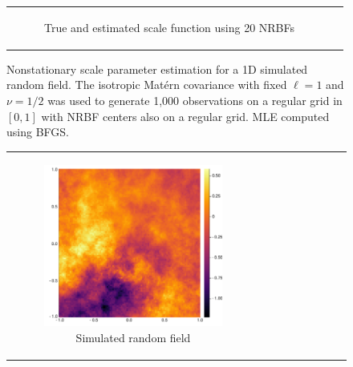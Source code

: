 \documentclass{article}
\numberwithin{equation}{section}
\begin{document}
\begin{figure}[t!]
\begin{tabular}{cc}
\begin{subfigure}[t]{0.3\textwidth}
      \caption{True and estimated scale function using 20 NRBFs}
    \end{subfigure}
  \end{tabular}
  \caption{Nonstationary scale parameter estimation for a 1D simulated random field. The isotropic Mat\'ern covariance with fixed $\ell=1$ and $\nu=1/2$ was used to generate 1,000 observations on a regular grid in $[0,1]$ with NRBF centers also on a regular grid. MLE computed using BFGS.}
  \label{}
\end{figure}

\begin{figure}[t!]
  \centering
  \begin{tabular}{ccc}
    \begin{subfigure}[t]{0.3\textwidth}
      \includegraphics[width=\textwidth]{figures/isotropic/dat-nsr-p10000.pdf}
      \caption{Simulated random field}
    \end{subfigure} &
    \begin{subfigure}[t]{0.3\textwidth}

\end{subfigure}
\end{tabular}
\end{figure}
\end{document}
